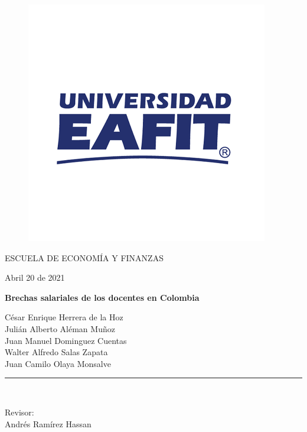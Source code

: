 \documentclass[a4paper]{article}
\begin{document}
	
	\begin{titlepage}
	\begin{center}
		\vspace*{-1in}
			
		\begin{figure}[tbh]
			\centering
			\includegraphics[width=0.7\linewidth]{eafit}
			\label{fig:eafit}
		\end{figure}
			
			ESCUELA DE ECONOMÍA Y FINANZAS\\
			\vspace*{0.6in}
			
		\begin{large}
		    Abril 20 de 2021\\
		\end{large}
			\vspace*{0.2in}
			
		\begin{Large}
			\textbf{Brechas salariales de los docentes en Colombia} \\
		\end{Large}
			\vspace*{0.3in}
			
		\begin{large}
			César Enrique Herrera de la Hoz\\
			Julián Alberto Aléman Muñoz\\
			Juan Manuel Dominguez Cuentas\\
			Walter Alfredo Salas Zapata\\
			Juan Camilo Olaya Monsalve
		\end{large}
			\vspace*{0.3in}
			\rule{80mm}{0.1mm}\\
			\vspace*{0.1in}
			
		\begin{large}
			Revisor: \\
			Andrés Ramírez Hassan\\
		\end{large}  	
			
	\end{center}	    
	\end{titlepage}
	
\end{document}
